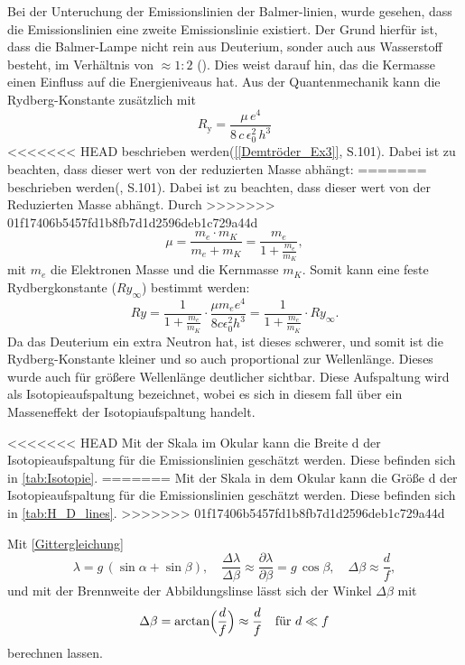Bei der Unteruchung der Emissionslinien der Balmer-linien, wurde gesehen, dass die Emissionslinien eine zweite Emissionslinie existiert.
Der Grund hierfür ist, dass die Balmer-Lampe nicht rein aus Deuterium, sonder auch aus Wasserstoff besteht, im Verhältnis von $\approx 1 : 2$ (\cite{praktikum}). 
Dies weist darauf hin, das die Kermasse einen Einfluss auf die Energieniveaus hat. 
Aus der Quantenmechanik kann die Rydberg-Konstante zusätzlich mit 
\begin{equation}
  R_{\mathrm{y}} = \frac{\mu\,e^4}{8\,c\,\epsilon_0^2\,h^3}
\end{equation}
<<<<<<< HEAD
beschrieben werden(\cref{[Demtröder_Ex3]}, S.101). Dabei ist zu beachten, dass dieser wert von der reduzierten Masse abhängt:
=======
beschrieben werden(\cite{Demtröder_Ex3}, S.101). Dabei ist zu beachten, dass dieser wert von der Reduzierten Masse abhängt.
Durch 
>>>>>>> 01f17406b5457fd1b8fb7d1d2596deb1c729a44d
\begin{equation}
    \mu = \frac{m_e \cdot m_K}{m_e + m_K} = \frac{m_e}{1+\frac{m_e}{m_K}},
\end{equation}
mit $m_e$ die Elektronen Masse und die Kernmasse $m_K$.
Somit kann eine feste Rydbergkonstante ($Ry_\infty$) bestimmt werden: 
\begin{equation}
    Ry = \frac{1}{1+\frac{m_e}{m_K}}\cdot \frac{\mu m_e e^4}{8c \epsilon_0^2h^3} = \frac{1}{1 + \frac{m_e}{m_K}}\cdot Ry_\infty.
\end{equation}
Da das Deuterium ein extra Neutron hat, ist dieses schwerer, und somit ist die Rydberg-Konstante kleiner und so auch proportional zur Wellenlänge. 
Dieses wurde auch für größere Wellenlänge deutlicher sichtbar.
Diese Aufspaltung wird als Isotopieaufspaltung bezeichnet, wobei es sich in diesem fall über ein Masseneffekt der Isotopiaufspaltung handelt.

<<<<<<< HEAD
Mit der Skala im Okular kann die Breite d der Isotopieaufspaltung für die Emissionslinien geschätzt werden. 
Diese befinden sich in \cref{tab:Isotopie}.
=======
Mit der Skala in dem Okular kann die Größe d der Isotopieaufspaltung für die Emissionslinien geschätzt werden. 
Diese befinden sich in \cref{tab:H_D_lines}.
>>>>>>> 01f17406b5457fd1b8fb7d1d2596deb1c729a44d

Mit \cref{Gittergleichung}
\begin{equation}
  \lambda = g\,(\sin\alpha + \sin\beta),
  \quad
\frac{\Delta\lambda}{\Delta\beta} \approx 
  \frac{\partial\lambda}{\partial\beta} = g\,\cos\beta,
  \label{deltalambda}
  \quad
  \Delta\beta \approx \frac{d}{f},
\end{equation}
und mit der Brennweite der Abbildungslinse lässt sich der Winkel $\Delta\beta$ mit 
\begin{equation}
    \Delta\beta = \arctan\Bigl(\frac{d}{f}\Bigr) \approx \frac{d}{f} \quad \text{für } d \ll f
\end{equation}
berechnen lassen.

